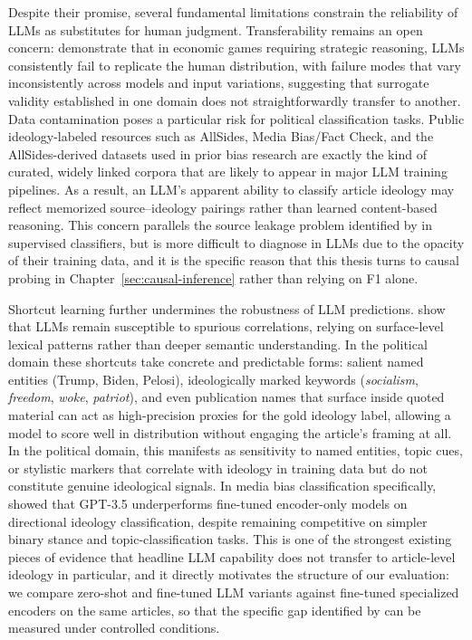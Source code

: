 Despite their promise, several fundamental limitations constrain the reliability of LLMs as substitutes for human judgment. Transferability remains an open concern: \citet{gao2025LLMscaution} demonstrate that in economic games requiring strategic reasoning, LLMs consistently fail to replicate the human  distribution, with failure modes that vary inconsistently across models and input variations, suggesting that surrogate validity established in one domain does not straightforwardly transfer to another. Data contamination poses a particular risk for political classification tasks. Public ideology-labeled resources such as AllSides, Media Bias/Fact Check, and the AllSides-derived datasets used in prior bias research are exactly the kind of curated, widely linked corpora that are likely to appear in major LLM training pipelines. As a result, an LLM's apparent ability to classify article ideology may reflect memorized source--ideology pairings rather than learned content-based reasoning. This concern parallels the source leakage problem identified by \citet{baly2020we} in supervised classifiers, but is more difficult to diagnose in LLMs due to the opacity of their training data, and it is the specific reason that this thesis turns to causal probing in Chapter~\ref{sec:causal-inference} rather than relying on F1 alone.

Shortcut learning further undermines the robustness of LLM predictions. \citet{yuan2024llmsovercomeshortcutlearning} show that LLMs remain susceptible to spurious correlations, relying on surface-level lexical patterns rather than deeper semantic understanding. In the political domain these shortcuts take concrete and predictable forms: salient named entities (Trump, Biden, Pelosi), ideologically marked keywords (\emph{socialism}, \emph{freedom}, \emph{woke}, \emph{patriot}), and even publication names that surface inside quoted material can act as high-precision proxies for the gold ideology label, allowing a model to score well in distribution without engaging the article's framing at all. In the political domain, this manifests as sensitivity to named entities, topic cues, or stylistic markers that correlate with ideology in training data but do not constitute genuine ideological signals. In media bias classification specifically, \citet{Wen_2023} showed that GPT-3.5 underperforms fine-tuned encoder-only models on directional ideology classification, despite remaining competitive on simpler binary stance and topic-classification tasks. This is one of the strongest existing pieces of evidence that headline LLM capability does not transfer to article-level ideology in particular, and it directly motivates the structure of our evaluation: we compare zero-shot and fine-tuned LLM variants against fine-tuned specialized encoders on the same articles, so that the specific gap identified by \citet{Wen_2023} can be measured under controlled conditions.

